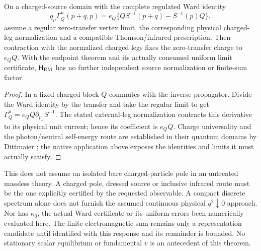 \documentclass[12pt,a4paper]{article}
\newcommand{\Hem}{\mathsf{H}_{\rm EM}}
\begin{document}
\begin{corollary}
\label{p5c:cor:v2210-lit-thomson-ward}
On a charged-source domain with the complete regulated Ward identity
\[
 q_\mu\Gamma_Q^\mu(p+q,p)
 =e_Q\{Q S^{-1}(p+q)-S^{-1}(p)Q\},
\]
assume a regular zero-transfer vertex limit, the corresponding physical
charged-leg normalization and a compatible Thomson/infrared prescription.
Then contraction with the normalized charged legs fixes the zero-transfer
charge to \(e_Q Q\).  With the endpoint theorem and its actually consumed
uniform limit certificate, \(\Hem\) has no further independent source
normalization or finite-sum factor.
\end{corollary}
\begin{proof}
In a fixed charged block \(Q\) commutes with the inverse propagator.
Divide the Ward identity by the transfer and take the regular limit to get
\(\Gamma_Q^\mu=e_Q Q\partial_{p_\mu}S^{-1}\).  The stated external-leg
normalization contracts this derivative to its physical unit current;
hence its coefficient is \(e_Q Q\).  Charge universality and the
photon/neutral self-energy route are established in their quantum domains
by Dittmaier \cite{LitSMWardThomson2021}; the native application above
exposes the identities and limits it must actually satisfy.
\end{proof}
This does not assume an isolated bare charged-particle pole in an untreated
massless theory.  A charged pole, dressed source or inclusive infrared route
must be the one explicitly certified by the requested observable.  A compact
discrete spectrum alone does not furnish the assumed continuous physical
\(q^2\downarrow0\) approach.  Nor has \(\kappa_0\), the actual Ward
certificate or its uniform errors been numerically evaluated here.  The
finite electromagnetic sum remains only a representation candidate until
identified with this response and its remainder is bounded.  No stationary
scalar equilibrium or fundamental \(v\) is an antecedent of this theorem.
\end{document}
